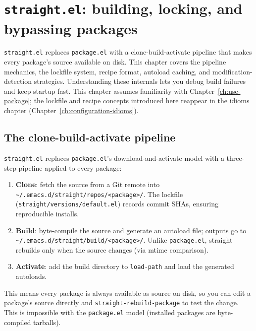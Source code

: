 \chapter{\texttt{straight.el}: building, locking, and bypassing packages}
\label{ch:straight}
\minitoc\label{straight.el-building-locking-and-bypassing-packages}

\texttt{straight.el} replaces \texttt{package.el} with a
clone-build-activate pipeline that makes every package's source
available on disk.  This chapter covers the pipeline mechanics,
the lockfile system, recipe format, autoload caching, and
modification-detection strategies.  Understanding these internals
lets you debug build failures and keep startup fast.
This chapter assumes familiarity with Chapter~\ref{ch:use-package};
the lockfile and recipe concepts introduced here reappear in the
idioms chapter (Chapter~\ref{ch:configuration-idioms}).

\section{The clone-build-activate pipeline}\label{the-clone-build-activate-pipeline}

\texttt{straight.el} replaces \texttt{package.el}'s download-and-activate model with a three-step pipeline applied to every package:

\begin{enumerate}
\item \textbf{Clone}: fetch the source from a Git remote into
  \texttt{\~{}/.emacs.d/\allowbreak straight/\allowbreak repos/\allowbreak <package>/}.
  The lockfile (\texttt{straight/\allowbreak versions/\allowbreak default.el}) records commit
  SHAs, ensuring reproducible installs.
\item \textbf{Build}: byte-compile the source and generate an autoload
  file; outputs go to
  \texttt{\~{}/.emacs.d/\allowbreak straight/\allowbreak build/\allowbreak <package>/}.
  Unlike \texttt{package.el}, straight rebuilds only when the source
  changes (via mtime comparison).
\item \textbf{Activate}: add the build directory to \texttt{load-path}
  and load the generated autoloads.
\end{enumerate}

This means every package is always available as source on disk, so you can edit a package's source directly and \texttt{straight-rebuild-package} to test the change. This is impossible with the \texttt{package.el} model (installed packages are byte-compiled tarballs).

